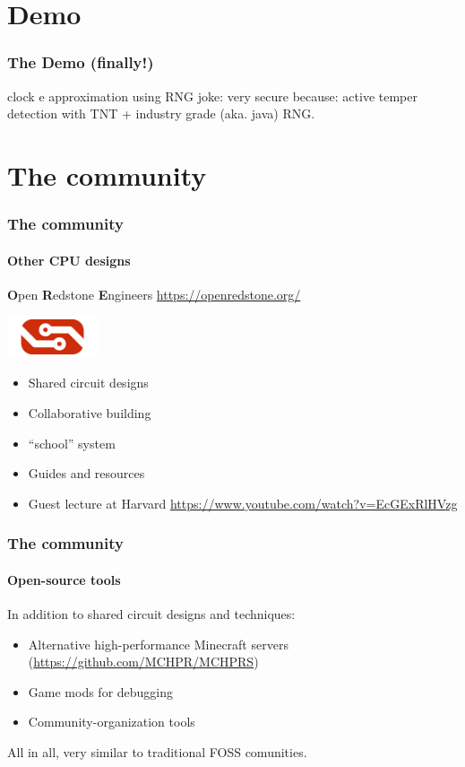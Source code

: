 \documentclass[aspectratio=169]{beamer}
\begin{document}
\section{Demo}

\begin{frame}
	\frametitle{The Demo (finally!)}
	clock
	e approximation using RNG
	joke: very secure because: active temper detection with TNT + industry grade (aka. java) RNG.
\end{frame}

\section{The community}

\begin{frame}
	\frametitle{The community}
	\framesubtitle{Other CPU designs}

	\textbf{O}pen \textbf{R}edstone \textbf{E}ngineers
	\url{https://openredstone.org/}

	\includegraphics[width=0.2\textwidth]{imgs/ore.png}

	\begin{itemize}

		\item Shared circuit designs
		\item Collaborative building
		\item ``school'' system
		\item Guides and resources
		\item Guest lecture at Harvard \url{https://www.youtube.com/watch?v=EcGExRlHVzg}
	\end{itemize}
\end{frame}

\begin{frame}
	\frametitle{The community}
	\framesubtitle{Open-source tools}

	In addition to shared circuit designs and techniques:

	\begin{itemize}
		\item Alternative high-performance Minecraft servers (\url{https://github.com/MCHPR/MCHPRS})
		\item Game mods for debugging
		\item Community-organization tools
	\end{itemize}

	\pause

	All in all, very similar to traditional FOSS comunities.

\end{frame}
\end{document}
